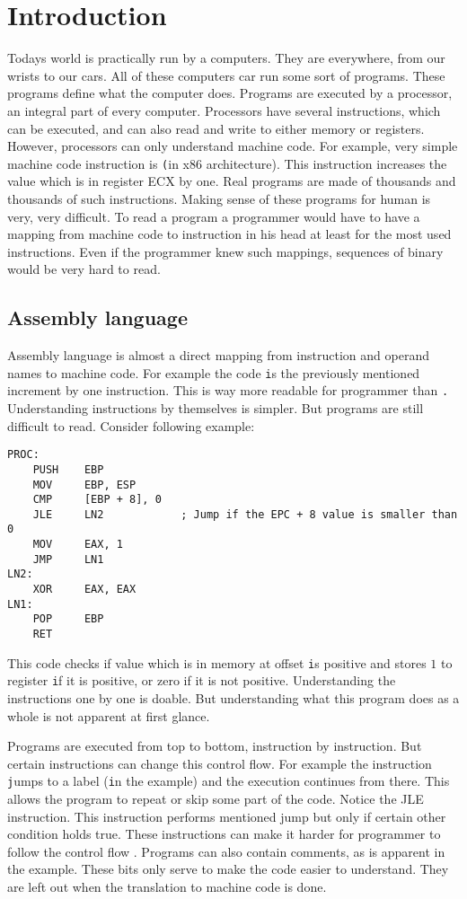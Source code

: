 \chapter{Introduction}
Todays world is practically run by a computers. They are everywhere, from our wrists to our cars.
All of these computers car run some sort of programs. These programs define what the computer does.
Programs are executed by a processor, an integral part of every computer. Processors have several instructions,
which can be executed, and can also read and write to either memory or registers. However, processors can only
understand machine code. For example, very simple machine code instruction is \texttt (in x86 architecture).
This instruction increases the value which is in register ECX by one. Real programs are made of thousands and thousands of
such instructions. Making sense of these programs for human is very, very difficult. To read a program a programmer would
have to have a mapping from machine code to instruction in his head at least for the most used instructions. Even if the
programmer knew such mappings, sequences of binary would be very hard to read. 

\section{Assembly language}
Assembly language is almost a direct mapping from instruction and operand names to machine code. For example the code \texttt
is the previously mentioned increment by one instruction. This is way more readable for programmer than \texttt.
Understanding instructions by themselves is simpler. But programs are still difficult to read. Consider following example:
\begin{lstlisting}
PROC:
    PUSH    EBP
    MOV     EBP, ESP
    CMP     [EBP + 8], 0
    JLE     LN2            ; Jump if the EPC + 8 value is smaller than 0
    MOV     EAX, 1
    JMP     LN1
LN2:
    XOR     EAX, EAX
LN1:
    POP     EBP
    RET
\end{lstlisting}
This code checks if value which is in memory at offset \texttt is positive and stores $1$ to register \texttt if it is positive, or zero
if it is not positive. Understanding the instructions one by one is doable. But understanding what this program does as a whole is not apparent at first glance. 

Programs are executed from top to bottom, instruction by instruction. But certain instructions can change this control flow. For example the instruction \texttt
jumps to a label (\texttt in the example) and the execution continues from there. This allows the program to repeat or skip some part of the code.
Notice the JLE instruction. This instruction performs mentioned jump but only if certain other condition holds true.
These instructions can make it harder for programmer to follow the control flow .
Programs can also contain comments, as is apparent in the example. These bits only serve to make the code easier to understand.
They are left out when the translation to machine code is done.

